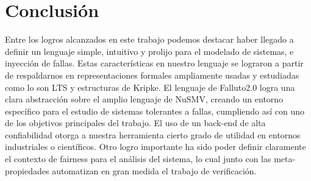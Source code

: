 \documentclass[pdftex,a4paper,12pt]{book}
\begin{document}



\chapter{Conclusi\'on}

Entre los logros alcanzados en este trabajo podemos destacar haber llegado a definir un lenguaje simple, intuitivo y prolijo para el modelado de sistemas, e inyecci\'on de fallas. Estas caracter\'isticas en nuestro lenguaje se lograron a partir de respaldarnos en representaciones formales ampliamente usadas y estudiadas como lo son LTS y estructuras de Kripke. El lenguaje de Falluto2.0 logra una clara abstracci\'on sobre el amplio lenguaje de NuSMV, creando un entorno espec\'ifico para el estudio de sistemas tolerantes a fallas, cumpliendo as\'i con uno de los objetivos principales del trabajo. El uso de un back-end de alta confiabilidad otorga a nuestra herramienta cierto grado de utilidad en entornos industriales o cient\'ificos. Otro logro importante ha sido poder definir claramente el contexto de fairness para el an\'alisis del sistema, lo cual junto con las meta-propiedades automatizan en gran medida el trabajo de verificaci\'on.
\end{document}
